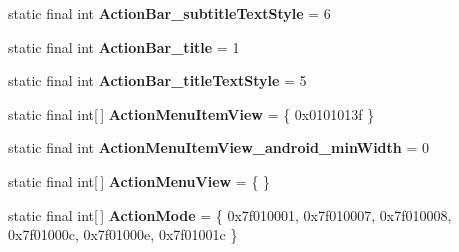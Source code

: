\begin{DoxyCompactItemize}
\item 
\hypertarget{classandroid_1_1support_1_1v7_1_1appcompat_1_1_r_1_1styleable_a781dc187d0cfb26129ebda2fdcaa0643}{}static final int {\bfseries Action\+Bar\+\_\+subtitle\+Text\+Style} = 6\label{classandroid_1_1support_1_1v7_1_1appcompat_1_1_r_1_1styleable_a781dc187d0cfb26129ebda2fdcaa0643}

\item 
\hypertarget{classandroid_1_1support_1_1v7_1_1appcompat_1_1_r_1_1styleable_a19035537ac5f35fe63e49623336b62b3}{}static final int {\bfseries Action\+Bar\+\_\+title} = 1\label{classandroid_1_1support_1_1v7_1_1appcompat_1_1_r_1_1styleable_a19035537ac5f35fe63e49623336b62b3}

\item 
\hypertarget{classandroid_1_1support_1_1v7_1_1appcompat_1_1_r_1_1styleable_a77bef956ecd272f3533af6b1ca36854d}{}static final int {\bfseries Action\+Bar\+\_\+title\+Text\+Style} = 5\label{classandroid_1_1support_1_1v7_1_1appcompat_1_1_r_1_1styleable_a77bef956ecd272f3533af6b1ca36854d}

\item 
\hypertarget{classandroid_1_1support_1_1v7_1_1appcompat_1_1_r_1_1styleable_a289a3ec3805aee2d895cf1061f6f50dd}{}static final int\mbox{[}$\,$\mbox{]} {\bfseries Action\+Menu\+Item\+View} = \{ 0x0101013f \}\label{classandroid_1_1support_1_1v7_1_1appcompat_1_1_r_1_1styleable_a289a3ec3805aee2d895cf1061f6f50dd}

\item 
\hypertarget{classandroid_1_1support_1_1v7_1_1appcompat_1_1_r_1_1styleable_ab1d71534a260d9546c5e69b7d0e88dc5}{}static final int {\bfseries Action\+Menu\+Item\+View\+\_\+android\+\_\+min\+Width} = 0\label{classandroid_1_1support_1_1v7_1_1appcompat_1_1_r_1_1styleable_ab1d71534a260d9546c5e69b7d0e88dc5}

\item 
\hypertarget{classandroid_1_1support_1_1v7_1_1appcompat_1_1_r_1_1styleable_a0ac51d00b657dc8329501efc4804c1be}{}static final int\mbox{[}$\,$\mbox{]} {\bfseries Action\+Menu\+View} = \{ \}\label{classandroid_1_1support_1_1v7_1_1appcompat_1_1_r_1_1styleable_a0ac51d00b657dc8329501efc4804c1be}

\item 
\hypertarget{classandroid_1_1support_1_1v7_1_1appcompat_1_1_r_1_1styleable_ac4197f1a9a85a8f5973cc5efa358ad9f}{}static final int\mbox{[}$\,$\mbox{]} {\bfseries Action\+Mode} = \{ 0x7f010001, 0x7f010007, 0x7f010008, 0x7f01000c, 0x7f01000e, 0x7f01001c \}\label{classandroid_1_1support_1_1v7_1_1appcompat_1_1_r_1_1styleable_ac4197f1a9a85a8f5973cc5efa358ad9f}


\end{DoxyCompactItemize}
